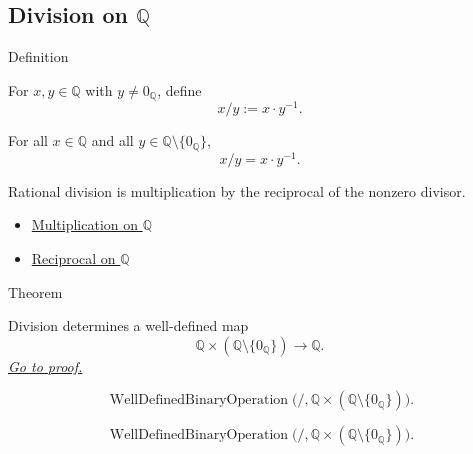 \subsection*{\texorpdfstring{Division on $\mathbb{Q}$}{Division on Q}}

\begin{definitionbox}{Definition}
\begin{definition}
\label{def:division-on-q}
For $x,y\in\mathbb{Q}$ with $y\ne 0_{\mathbb{Q}}$, define
\[
x/y:=x\cdot y^{-1}.
\]
\end{definition}
\end{definitionbox}

\begin{remark*}
For all $x\in\mathbb{Q}$ and all $y\in\mathbb{Q}\setminus\{0_{\mathbb{Q}}\}$,
\[
x/y=x\cdot y^{-1}.
\]
\end{remark*}

\begin{remark*}[Interpretation]
Rational division is multiplication by the reciprocal of the nonzero divisor.
\end{remark*}

\begin{dependencies}
\begin{itemize}
  \item \hyperref[def:multiplication-on-q-classes]{Multiplication on $\mathbb{Q}$}
  \item \hyperref[def:reciprocal-on-q-classes]{Reciprocal on $\mathbb{Q}$}
\end{itemize}
\end{dependencies}

\begin{theorembox}{Theorem}
\begin{theorem}
\label{thm:division-on-q-well-defined}
Division determines a well-defined map
\[
\mathbb{Q}\times(\mathbb{Q}\setminus\{0_{\mathbb{Q}}\})\to\mathbb{Q}.
\]
\hyperref[prf:division-on-q-well-defined]{\textit{Go to proof.}}
\end{theorem}
\end{theorembox}

\begin{remark*}
\[
\operatorname{WellDefinedBinaryOperation}
\bigl(/,\mathbb{Q}\times(\mathbb{Q}\setminus\{0_{\mathbb{Q}}\})\bigr).
\]
\end{remark*}

\begin{remark*}
\[
\operatorname{WellDefinedBinaryOperation}
\bigl(/,\mathbb{Q}\times(\mathbb{Q}\setminus\{0_{\mathbb{Q}}\})\bigr).
\]
\end{remark*}

